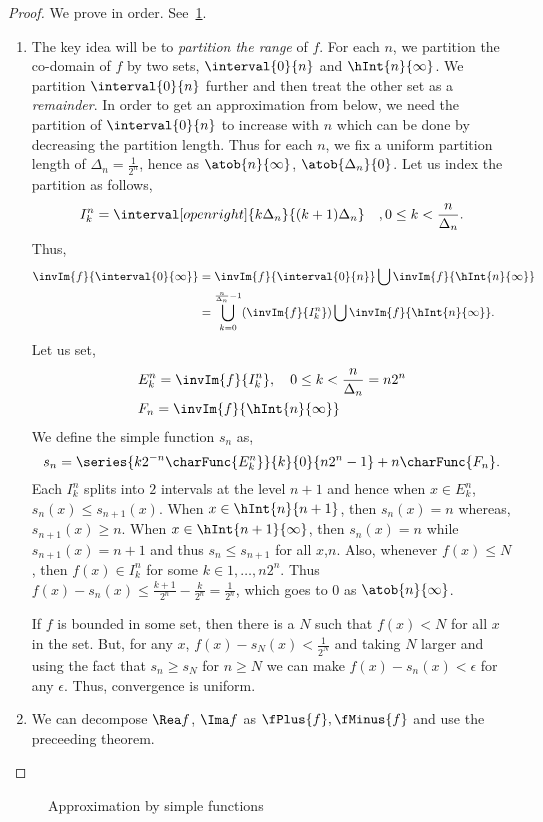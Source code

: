 \begin{proof}
    We prove in order. See~\ref{fig:tikz:approx_simple_func}. 
    \begin{enumerate}
	\item
	    The key idea will be to \emph{partition the range} of $f$. For each $n$, we partition the
	    co-domain of $f$ by two sets,
	    $\interval{0}{n}$ and $\hInt{n}{\infty}$. We partition $\interval{0}{n}$ further and then treat
	    the other set as a \emph{remainder}. In order to get an approximation from below, we need the
	    partition of $\interval{0}{n}$ to increase with $n$ which can be done by decreasing the 
	    partition length. 
	    Thus for each $n$, 
	    we fix a uniform partition length of $\Delta_n = \frac{1}{2^n}$, hence as $\atob{n}{\infty}$,
	    $\atob{\Delta_n}{0}$. Let us index the partition as follows,
	    \[I_k^n = \interval[open right]{k\Delta_n}{(k+1)\Delta_n}\quad,0\leq k < \frac{n}{\Delta_n}.\]
	    Thus,
	    \begin{align*}\invIm{f}{\interval{0}{\infty}} &= \invIm{f}{\interval{0}{n}} 
		\bigcup \invIm{f}{\hInt{n}{\infty}} \\
		& = \bigcup\limits_{k=0}^{\frac{n}{\Delta_n}-1}(\invIm{f}{I_k^n}) \bigcup 
		\invIm{f}{\hInt{n}{\infty}}. \\ 
	    \end{align*}
	    Let us set,
	    \begin{align*}
		& E_k^n = \invIm{f}{I_k^n},\quad 0\leq k < \frac{n}{\Delta_n} = n2^n\\
		& F_n = \invIm{f}{\hInt{n}{\infty}}
	    \end{align*}
	    We define the simple function $s_n$ as,
	    \[s_n = \series{k2^{-n}\charFunc{E_k^n}}{k}{0}{n2^n-1} + n\charFunc{F_n}.\]
	    Each $I_k^n$ splits into $2$ intervals at the level $n+1$ and hence when $x \in E_k^n$, $s_n(x)
	    \leq s_{n+1}(x)$. When $x \in \hInt{n}{n+1}$, then $s_n(x) = n$ whereas, $s_{n+1}(x) \geq n$. When
	    $x\in \hInt{n+1}{\infty}$, then $s_n(x) = n$ while $s_{n+1}(x) = n+1$ and thus $s_n \leq s_{n+1}$
	    for all $x$,$n$. Also, whenever $f(x) \leq N$, then $f(x) \in I_k^n$ for some $k \in
	    1,\dots,n2^n$. Thus $f(x) - s_n(x) \leq \frac{k+1}{2^n} - \frac{k}{2^n} = \frac{1}{2^n}$, which
	    goes to $0$ as $\atob{n}{\infty}$. 

	    If $f$ is bounded in some set, then there is a $N$ such that $f(x) < N$ for
	    all $x$ in the set. 
	    But, for any $x$, $f(x) - s_N(x) < \frac{1}{2^N}$ and taking $N$ larger and using the
	    fact that $s_n \geq s_N$ for $n\geq N$ we can make $f(x) - s_n(x) < \epsilon$ for any $\epsilon$.
	    Thus, convergence is uniform.
	\item
	    We can decompose $\Rea f$, $\Ima f$ as $\fPlus{f},\fMinus{f}$ and use the preceeding theorem.
    \end{enumerate}
\end{proof}

\begin{figure}
  
  \caption{Approximation by simple functions}\label{fig:tikz:approx_simple_func}
\end{figure}
\break{}
